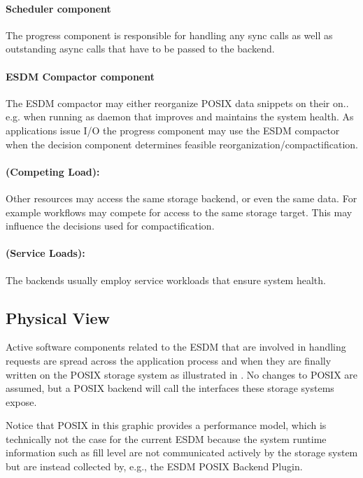 \paragraph{Scheduler component}
The progress component is responsible for handling any sync calls as well as outstanding async calls that have to be passed to the backend.


\paragraph{ESDM Compactor component}
The ESDM compactor may either reorganize POSIX data snippets on their on.. e.g. when running as daemon that improves and maintains the system health.
As applications issue I/O the progress component may use the ESDM compactor when the decision component determines feasible reorganization/compactification.


\paragraph{(Competing Load):}
Other resources may access the same storage backend, or even the same data.
For example workflows may compete for access to the same storage target.
This may influence the decisions used for compactification.


\paragraph{(Service Loads):}
The backends usually employ service workloads that ensure system health.




\subsection{Physical View}

Active software components related to the ESDM that are involved in handling requests are spread across the application process and when they are finally written on the POSIX storage system as illustrated in .
No changes to POSIX are assumed, but a POSIX backend will call the interfaces these storage systems expose.

Notice that POSIX in this graphic provides a performance model, which is technically not the case for the current ESDM because the system runtime information such as fill level are not communicated actively by the storage system but are instead collected by, e.g., the ESDM POSIX Backend Plugin.


